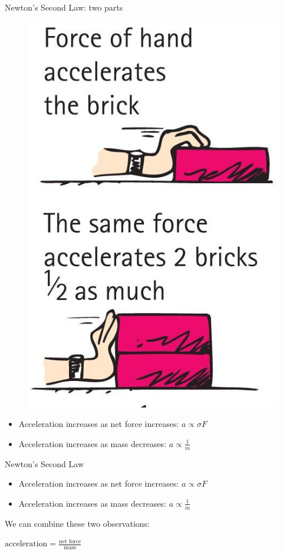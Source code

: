 \documentclass[english]{beamer}
\begin{document}
\begin{frame}{Newton's Second Law: two parts}
\begin{figure}[!tbp]
\begin{minipage}[b]{0.4\textwidth}
      \includegraphics[height=0.6\textheight]{./04_11_Figure_cropped.jpg}
    \end{minipage}
  \end{figure}
  \begin{itemize}
    \item Acceleration increases as net force increases: $a \propto \sigma F$
    \item Acceleration increases as mass decreases: $a \propto \frac{1}{m}$
  \end{itemize}
\end{frame}

\begin{frame}{Newton's Second Law}
  \begin{itemize}
    \item Acceleration increases as net force increases: $a \propto \sigma F$
    \item Acceleration increases as mass decreases: $a \propto \frac{1}{m}$
  \end{itemize}
  We can combine these two observations:
  \begin{center}
    $\text{acceleration} = \frac{\text{net force}}{\text{mass}}$\\
  \end{center}
\end{frame}
\end{document}
